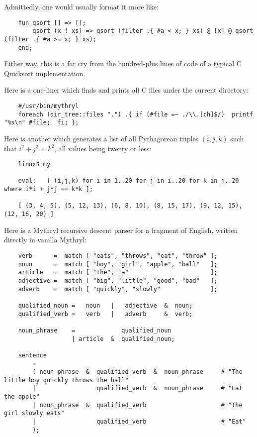 Admittedly, one would usually format it more like:

\begin{verbatim}
    fun qsort [] => [];
        qsort (x ! xs) => qsort (filter .{ #a < x; } xs) @ [x] @ qsort (filter .{ #a >= x; } xs);
    end;
\end{verbatim}

Either way, this is a far cry from the hundred-plus lines of code of a typical C Quicksort implementation.

Here is a one-liner which finds and prints all C files under the current directory:

\begin{verbatim}
    #/usr/bin/mythryl
    foreach (dir_tree::files ".") .{ if (#file =~ ./\\.[ch]$/)  printf "%s\n" #file;  fi; };
\end{verbatim}

Here is another which generates a list of all Pythagorean triples $(i,j,k)$ such that $i^2 + j^2 = k^2$, 
all values being twenty or less:

\begin{verbatim}
    linux$ my

    eval:   [ (i,j,k) for i in 1..20 for j in i..20 for k in j..20 where i*i + j*j == k*k ];

    [ (3, 4, 5), (5, 12, 13), (6, 8, 10), (8, 15, 17), (9, 12, 15), (12, 16, 20) ]
\end{verbatim}

Here is a Mythryl recursive descent parser for a fragment of English, written 
directly in vanilla Mythryl:

\begin{verbatim}
    verb      =  match [ "eats", "throws", "eat", "throw" ];
    noun      =  match [ "boy", "girl", "apple", "ball"   ];
    article   =  match [ "the", "a"                       ];
    adjective =  match [ "big", "little", "good", "bad"   ];
    adverb    =  match [ "quickly", "slowly"              ];

    qualified_noun =   noun   |   adjective  &  noun;
    qualified_verb =   verb   |   adverb     &  verb;

    noun_phrase    =             qualified_noun
                   | article  &  qualified_noun;

    sentence
        =
        ( noun_phrase  &  qualified_verb  &  noun_phrase     # "The little boy quickly throws the ball"
        |                 qualified_verb  &  noun_phrase     # "Eat the apple"
        | noun_phrase  &  qualified_verb                     # "The girl slowly eats"
        |                 qualified_verb                     # "Eat"
        );
\end{verbatim}

